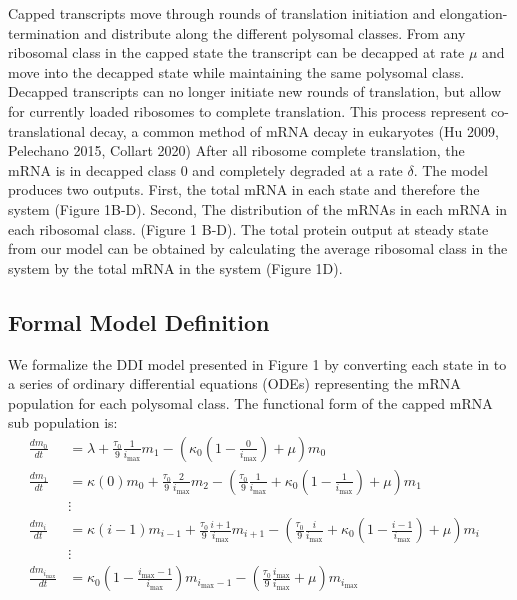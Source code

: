 \documentclass[review]{elsarticle}
\newcommand{\imax}{\ensuremath{{i_{\max}}}\xspace}
\begin{document}
Capped transcripts move through rounds of translation initiation and elongation-termination and distribute along the different polysomal classes. 
From any ribosomal class in the capped state the transcript can be decapped at rate $\mu$  and move into the decapped state while maintaining the same polysomal class.
Decapped transcripts can no longer initiate new rounds of translation, but allow for currently loaded ribosomes to complete translation. 
This process represent co-translational decay, a common method of mRNA decay in eukaryotes (Hu 2009, Pelechano 2015, Collart 2020) 
After all ribosome complete translation, the mRNA is in decapped class 0 and completely degraded at a rate $\delta$.
The model produces two outputs. 
First, the total mRNA in each state and therefore the system (Figure 1B-D). 
Second, The distribution of the mRNAs in each mRNA in each ribosomal class. (Figure 1 B-D).
The total protein output at steady state from our model can be obtained by calculating the average ribosomal class in the system by the total mRNA in the system (Figure 1D). 

\subsection{Formal Model Definition}
We formalize the DDI model presented in Figure 1 by converting each state in to a series of ordinary differential equations (ODEs) representing the mRNA population for each polysomal class. 
The functional form of the capped mRNA sub population is:
\begin{align} \label{eq:Capped_ODE}
\frac{dm_{0}}{dt} &= \lambda+\frac{\tau_0}{9}\frac{1}{\imax}m_{1}-\left(\kappa_0\left(1-\frac{0}{\imax}\right) + \mu\right)m_{0} \\ \nonumber
\frac{dm_{1}}{dt} &= \kappa(0)m_{0}+\frac{\tau_0}{9}\frac{2}{\imax}m_{2}-\left(\frac{\tau_0}{9}\frac{1}{\imax}+\kappa_0\left(1-\frac{1}{\imax}\right)+\mu\right) m_{1}\\ \nonumber
& \vdots & \\ \nonumber
\frac{dm_{i}}{dt} &= \kappa(i-1)m_{i-1}+\frac{\tau_0}{9}\frac{i+1}{\imax}m_{i+1}-\left(\frac{\tau_0}{9}\frac{i}{\imax}+\kappa_0\left(1-\frac{i-1}{\imax}\right)+\mu\right) m_{i} \\ \nonumber
& \vdots & \\ \nonumber
\frac{dm_{\imax}}{dt} &= \kappa_0\left(1-\frac{\imax-1}{\imax}\right)m_{\imax-1}-\left(\frac{\tau_0}{9}\frac{\imax}{\imax}+\mu\right) m_{\imax}\\ \nonumber
\end{align}
\end{document}
